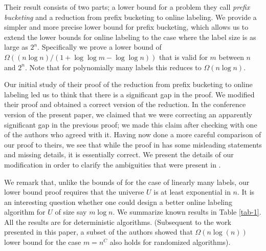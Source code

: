 \documentclass[11pt]{article}
\begin{document}
Their result consists of two parts; a lower bound for a problem they call {\em prefix bucketing}
and a reduction from prefix bucketing to online labeling.
We provide a simpler and more precise lower bound for prefix bucketing,
which allows us to extend the lower bounds for online labeling to the case where the label size is as large as $2^{n}$.
Specifically we prove a lower bound of
$\Omega((n \log n) / (1+\log \log m - \log \log n))$ that is valid
for $m$ between $n$ and $2^{n}$.
Note that for polynomially many labels this reduces to $\Omega(n \log n)$.

Our initial study of their proof of the reduction from prefix bucketing to online
labeling \cite{DSZ04} led us to think that there is a significant gap in the proof.
We modified their proof and obtained a correct version of the reduction.
In the conference version of the present paper,
we claimed that we were correcting an apparently significant gap in the previous proof;
we made this claim after checking with one of the authors who agreed with it.
Having now done a more careful comparison of our proof to theirs,
we see that while the proof in \cite{DSZ04} has some misleading statements and missing details,
it is essentially correct.
We present the details of our modification in order to clarify the ambiguities that were present in \cite{DSZ04}.


We remark that, unlike the bounds of \cite{BKS} for the case of linearly many labels, our lower bound proof requires that the universe
$U$ is at least exponential in $n$. It is an interesting question whether one could design
a better online labeling algorithm for $U$ of size say $m \log n$. We summarize known results in Table \ref{tab-1}. All the results
are for deterministic algorithms. (Subsequent to the work presented in this paper, 
a subset of the authors \cite{BKS2} showed that  $\Omega(n \log(n))$
lower bound 
for the case $m=n^C$ also holds for randomized algorithms).
\end{document}
